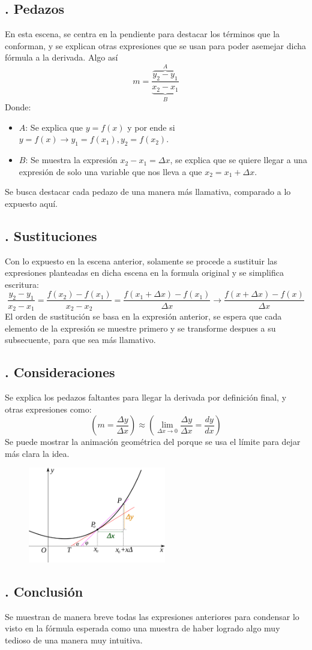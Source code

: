 \documentclass[letterpaper, 12pt]{article}
\begin{document}
\subsection*{{. Pedazos}} \justify
En esta escena, se centra en la pendiente para destacar los términos que la conforman, y se explican otras expresiones que se usan para poder asemejar dicha fórmula a la derivada. Algo así
\[m = \frac{\overbrace{y_2-y_1}^{A}}{\underbrace{x_2-x_1}_{B}}\]
Donde:
\begin{itemize}
    \item \(A\): Se explica que \(y=f(x)\) y por ende si \(y=f(x)\rightarrow y_1=f(x_1), y_2=f(x_2)\).
    \item \(B\): Se muestra la expresión \(x_2-x_1=\Delta x\), se explica que se quiere llegar a una expresión de solo una variable que nos lleva a que \(x_2=x_1+\Delta x\).
\end{itemize}
Se busca destacar cada pedazo de una manera más llamativa, comparado a lo expuesto aquí.
\subsection*{{. Sustituciones}} \justify
Con lo expuesto en la escena anterior, solamente se procede a sustituir las expresiones planteadas en dicha escena en la formula original y se simplifica escritura:
\[\frac{y_2-y_1}{x_2-x_1}=\frac{f(x_2)-f(x_1)}{x_2-x_2}=\frac{f(x_1+\Delta x)-f(x_1)}{\Delta x}\rightarrow\frac{f(x+\Delta x)-f(x)}{\Delta x}\]
El orden de sustitución se basa en la expresión anterior, se espera que cada elemento de la expresión se muestre primero y se transforme despues a su subsecuente, para que sea más llamativo.
\subsection*{{. Consideraciones}} \justify
Se explica los pedazos faltantes para llegar la derivada por definición final, y otras expresiones como:
\[\left(m=\frac{\Delta y}{\Delta x}\right)\approx\left(\lim_{\Delta x\rightarrow 0}\frac{\Delta y}{\Delta x}=\frac{dy}{dx}\right)\]
Se puede mostrar la animación geométrica del porque se usa el límite para dejar más clara la idea.
\begin{figure}[H]
    \centering
    \includegraphics[width=6cm]{geoddx.png}
\end{figure}
\subsection*{{. Conclusión}} \justify
Se  muestran de manera breve todas las expresiones anteriores para condensar lo visto en la fórmula esperada como una muestra de haber logrado algo muy tedioso de una manera muy intuitiva.
\end{document}
